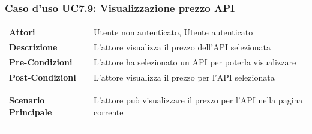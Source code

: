 \subsubsection{Caso d'uso UC7.9: Visualizzazione prezzo API}
\label{UC7_9}

\begin{minipage}{\linewidth}
	\begin{tabular}{ l | p{11cm}}
		\hline
		\rowcolor{Gray}
		\multicolumn{2}{c}{UC7.9 - Visualizzazione prezzo API} \\
		\hline
		\textbf{Attori} & Utente non autenticato, Utente autenticato \\
		\textbf{Descrizione} & L'attore visualizza il prezzo dell'API selezionata\\
		\textbf{Pre-Condizioni} & L'attore ha selezionato un API per poterla visualizzare\\
		\textbf{Post-Condizioni} & L'attore visualizza il prezzo per l'API selezionata \\
		\textbf{Scenario Principale} & 
		\begin{enumerate*}[label=(\arabic*.),itemjoin={\newline}]
			\item L'attore può visualizzare il prezzo per l'API nella pagina corrente
		\end{enumerate*}\\
	\end{tabular}
\end{minipage}
